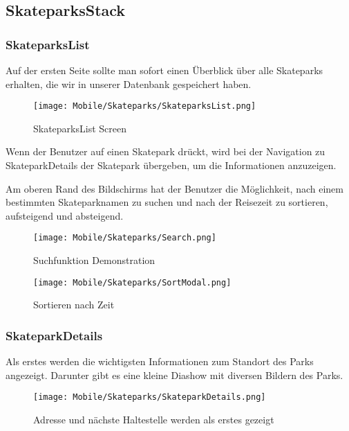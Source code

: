 \subsection{SkateparksStack}
\subsubsection{SkateparksList}
Auf der ersten Seite sollte man sofort einen Überblick über alle Skateparks erhalten, die wir in
unserer Datenbank gespeichert haben.

\begin{figure}[H]
  \begin{center}
    \texttt{[image: Mobile/Skateparks/SkateparksList.png]}
    \caption{SkateparksList Screen}
  \end{center}
\end{figure}

Wenn der Benutzer auf einen Skatepark drückt, wird bei der Navigation zu SkateparkDetails der
Skatepark übergeben, um die Informationen anzuzeigen.

Am oberen Rand des Bildschirms hat der Benutzer die Möglichkeit, nach einem bestimmten
Skateparknamen zu suchen und nach der Reisezeit zu sortieren, aufsteigend und absteigend.

\begin{figure}[H]
  \begin{center}
    \texttt{[image: Mobile/Skateparks/Search.png]}
    \caption{Suchfunktion Demonstration}
  \end{center}
\end{figure}

\begin{figure}[H]
  \begin{center}
    \texttt{[image: Mobile/Skateparks/SortModal.png]}
    \caption{Sortieren nach Zeit}
  \end{center}
\end{figure}

\subsubsection{SkateparkDetails}
Als erstes werden die wichtigsten Informationen zum Standort des Parks angezeigt. Darunter gibt es
eine kleine Diashow mit diversen Bildern des Parks.

\begin{figure}[H]
  \begin{center}
    \texttt{[image: Mobile/Skateparks/SkateparkDetails.png]}
    \caption{Adresse und nächste Haltestelle werden als erstes gezeigt}
  \end{center}
\end{figure}

